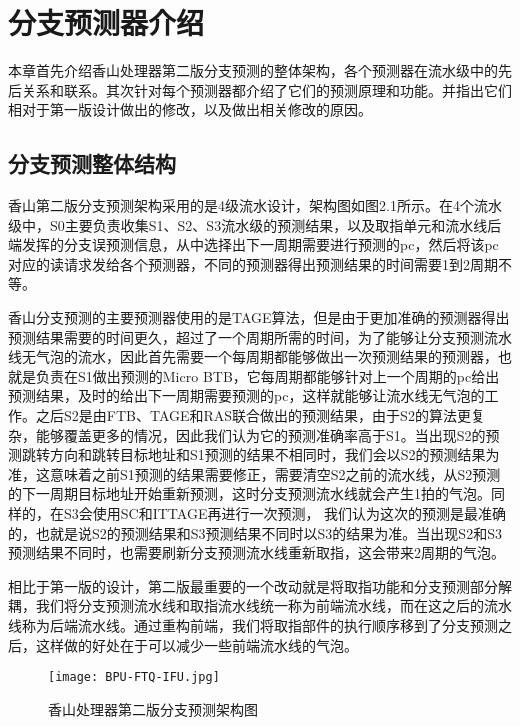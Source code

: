 \chapter{分支预测器介绍}


本章首先介绍香山处理器第二版分支预测的整体架构，各个预测器在流水级中的先后关系和联系。其次针对每个预测器都介绍了它们的预测原理和功能。并指出它们相对于第一版设计做出的修改，以及做出相关修改的原因。

\section{分支预测整体结构}

香山第二版分支预测架构采用的是4级流水设计，架构图如图2.1所示。在4个流水级中，S0主要负责收集S1、S2、S3流水级的预测结果，以及取指单元和流水线后端发挥的分支误预测信息，从中选择出下一周期需要进行预测的pc，然后将该pc对应的读请求发给各个预测器，不同的预测器得出预测结果的时间需要1到2周期不等。

香山分支预测的主要预测器使用的是TAGE算法，但是由于更加准确的预测器得出预测结果需要的时间更久，超过了一个周期所需的时间，为了能够让分支预测流水线无气泡的流水，因此首先需要一个每周期都能够做出一次预测结果的预测器，也就是负责在S1做出预测的Micro BTB，它每周期都能够针对上一个周期的pc给出预测结果，及时的给出下一周期需要预测的pc，这样就能够让流水线无气泡的工作。之后S2是由FTB、TAGE和RAS联合做出的预测结果，由于S2的算法更复杂，能够覆盖更多的情况，因此我们认为它的预测准确率高于S1。当出现S2的预测跳转方向和跳转目标地址和S1预测的结果不相同时，我们会以S2的预测结果为准，这意味着之前S1预测的结果需要修正，需要清空S2之前的流水线，从S2预测的下一周期目标地址开始重新预测，这时分支预测流水线就会产生1拍的气泡。同样的，在S3会使用SC和ITTAGE再进行一次预测， 我们认为这次的预测是最准确的，也就是说S2的预测结果和S3预测结果不同时以S3的结果为准。当出现S2和S3预测结果不同时，也需要刷新分支预测流水线重新取指，这会带来2周期的气泡。

相比于第一版的设计，第二版最重要的一个改动就是将取指功能和分支预测部分解耦，我们将分支预测流水线和取指流水线统一称为前端流水线，而在这之后的流水线称为后端流水线。通过重构前端，我们将取指部件的执行顺序移到了分支预测之后，这样做的好处在于可以减少一些前端流水线的气泡。

\begin{figure}[htb]
	\centering
	\setlength\tabcolsep{3pt}  %
	\vspace{5pt} %
	\texttt{[image: BPU-FTQ-IFU.jpg]}
	\caption{香山处理器第二版分支预测架构图}
	\label{fig:figure1}
\end{figure}

